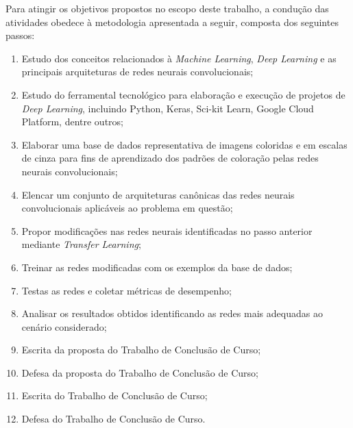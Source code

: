 Para atingir os objetivos propostos no escopo deste trabalho, a condução das atividades obedece à metodologia apresentada a seguir, composta dos seguintes passos:

\begin{enumerate}
	\item Estudo dos conceitos relacionados à \textit{Machine Learning}, \textit{Deep Learning} e as principais arquiteturas de redes neurais convolucionais;
	\item Estudo do ferramental tecnológico para elaboração e execução de projetos de \textit{Deep Learning}, incluindo Python, Keras, Sci-kit Learn, Google Cloud Platform, dentre outros;
	\item Elaborar uma base de dados representativa de imagens coloridas e em escalas de cinza para fins de aprendizado dos padrões de coloração pelas redes neurais convolucionais;
	\item Elencar um conjunto de arquiteturas canônicas das redes neurais convolucionais aplicáveis ao problema em questão;
	\item Propor modificações nas redes neurais identificadas no passo anterior mediante \textit{Transfer Learning};
	\item Treinar as redes modificadas com os exemplos da base de dados;
	\item Testas as redes e coletar métricas de desempenho;
	\item Analisar os resultados obtidos identificando as redes mais adequadas ao cenário considerado;
	\item Escrita da proposta do Trabalho de Conclusão de Curso;
	\item Defesa da proposta do Trabalho de Conclusão de Curso;
	\item Escrita do Trabalho de Conclusão de Curso;
	\item Defesa do Trabalho de Conclusão de Curso.
\end{enumerate}

